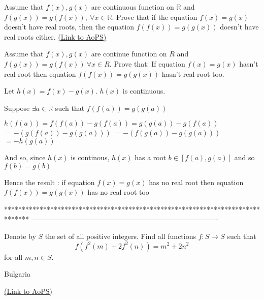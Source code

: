\begin{problem}
	Assume that $ f(x),g(x)$ are continuous function on $ \mathbb R$ and $ f(g(x))=g(f(x)),\ \forall x\in \mathbb R$. Prove that if the equation $ f(x)=g(x)$ doesn't have real roots, then the equation $ f(f(x))=g(g(x))$ doesn't have real roots either.
	\flushright \href{https://artofproblemsolving.com/community/c6h273920}{(Link to AoPS)}
\end{problem}



\begin{solution}
	\begin{tcolorbox}Assume that $ f(x),g(x)$ are continue function on $ R$ and $ f(g(x)) = g(f(x))\ \forall x\in R$. Prove that: If equation $ f(x) = g(x)$ hasn't real root then equation $ f(f(x)) = g(g(x))$ hasn't real root too.\end{tcolorbox}

Let $ h(x) = f(x) - g(x)$. $ h(x)$ is continuous.

Suppose $ \exists a\in \mathbb{R}$ such that $ f(f(a)) = g(g(a))$

$ h(f(a)) = f(f(a)) - g(f(a)) = g(g(a)) - g(f(a))$ $ = - (g(f(a)) - g(g(a)))$ $ = - (f(g(a)) - g(g(a)))$ $ = - h(g(a))$

And so, since $ h(x)$ is continous, $ h(x)$ has a root $ b\in [f(a),g(a)]$ and so $ f(b) = g(b)$

Hence the result : if equation $ f(x) = g(x)$ has no real root then equation $ f(f(x)) = g(g(x))$ has no real root too
\end{solution}
*******************************************************************************
-------------------------------------------------------------------------------

\begin{problem}
	Denote by $ S$ the set of all positive integers. Find all functions $ f: S \rightarrow S$ such that
\[ f (f^2(m) + 2f^2(n)) = m^2 + 2 n^2\]
for all $ m,n \in S$.

\begin{italicized}Bulgaria\end{italicized}
	\flushright \href{https://artofproblemsolving.com/community/c6h274322}{(Link to AoPS)}
\end{problem}



